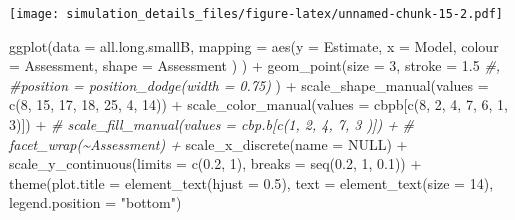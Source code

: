 \documentclass[
]{article}
\newenvironment{Shaded}{\begin{snugshade}}{\end{snugshade}}
\newcommand{\AttributeTok}[1]{\textcolor[rgb]{0.77,0.63,0.00}{#1}}
\newcommand{\CommentTok}[1]{\textcolor[rgb]{0.56,0.35,0.01}{\textit{#1}}}
\newcommand{\ConstantTok}[1]{\textcolor[rgb]{0.00,0.00,0.00}{#1}}
\newcommand{\DecValTok}[1]{\textcolor[rgb]{0.00,0.00,0.81}{#1}}
\newcommand{\FloatTok}[1]{\textcolor[rgb]{0.00,0.00,0.81}{#1}}
\newcommand{\FunctionTok}[1]{\textcolor[rgb]{0.00,0.00,0.00}{#1}}
\newcommand{\NormalTok}[1]{#1}
\newcommand{\SpecialCharTok}[1]{\textcolor[rgb]{0.00,0.00,0.00}{#1}}
\newcommand{\StringTok}[1]{\textcolor[rgb]{0.31,0.60,0.02}{#1}}
\begin{document}
\texttt{[image: simulation\_details\_files/figure-latex/unnamed-chunk-15-2.pdf]}

\begin{Shaded}
\begin{Highlighting}[]
\FunctionTok{ggplot}\NormalTok{(}\AttributeTok{data =}\NormalTok{ all.long.smallB,}
       \AttributeTok{mapping =} \FunctionTok{aes}\NormalTok{(}\AttributeTok{y =}\NormalTok{ Estimate,}
                     \AttributeTok{x =}\NormalTok{ Model, }
                     \AttributeTok{colour =}\NormalTok{ Assessment,}
                     \AttributeTok{shape =}\NormalTok{ Assessment}
\NormalTok{                     )}
\NormalTok{       ) }\SpecialCharTok{+}
  \FunctionTok{geom\_point}\NormalTok{(}\AttributeTok{size =} \DecValTok{3}\NormalTok{, }\AttributeTok{stroke =} \FloatTok{1.5}
             \CommentTok{\#,}
             \CommentTok{\#position = position\_dodge(width = 0.75)}
\NormalTok{             ) }\SpecialCharTok{+}
  \FunctionTok{scale\_shape\_manual}\NormalTok{(}\AttributeTok{values =} \FunctionTok{c}\NormalTok{(}\DecValTok{8}\NormalTok{, }\DecValTok{15}\NormalTok{, }\DecValTok{17}\NormalTok{, }\DecValTok{18}\NormalTok{, }\DecValTok{25}\NormalTok{, }\DecValTok{4}\NormalTok{, }\DecValTok{14}\NormalTok{)) }\SpecialCharTok{+}
  \FunctionTok{scale\_color\_manual}\NormalTok{(}\AttributeTok{values =}\NormalTok{ cbpb[}\FunctionTok{c}\NormalTok{(}\DecValTok{8}\NormalTok{, }\DecValTok{2}\NormalTok{, }\DecValTok{4}\NormalTok{, }\DecValTok{7}\NormalTok{, }\DecValTok{6}\NormalTok{, }\DecValTok{1}\NormalTok{, }\DecValTok{3}\NormalTok{)]) }\SpecialCharTok{+}
  \CommentTok{\# scale\_fill\_manual(values = cbp.b[c(1, 2, 4, 7, 3 )]) +}
  \CommentTok{\# facet\_wrap(\textasciitilde{}Assessment) +}
  \FunctionTok{scale\_x\_discrete}\NormalTok{(}\AttributeTok{name =} \ConstantTok{NULL}\NormalTok{) }\SpecialCharTok{+}
  \FunctionTok{scale\_y\_continuous}\NormalTok{(}\AttributeTok{limits =} \FunctionTok{c}\NormalTok{(}\FloatTok{0.2}\NormalTok{, }\DecValTok{1}\NormalTok{),}
                     \AttributeTok{breaks =} \FunctionTok{seq}\NormalTok{(}\FloatTok{0.2}\NormalTok{, }\DecValTok{1}\NormalTok{, }\FloatTok{0.1}\NormalTok{)) }\SpecialCharTok{+}
  \FunctionTok{theme}\NormalTok{(}\AttributeTok{plot.title =} \FunctionTok{element\_text}\NormalTok{(}\AttributeTok{hjust =} \FloatTok{0.5}\NormalTok{), }
        \AttributeTok{text =} \FunctionTok{element\_text}\NormalTok{(}\AttributeTok{size =} \DecValTok{14}\NormalTok{),}
        \AttributeTok{legend.position =} \StringTok{"bottom"}\NormalTok{)}
\end{Highlighting}
\end{Shaded}
\end{document}
